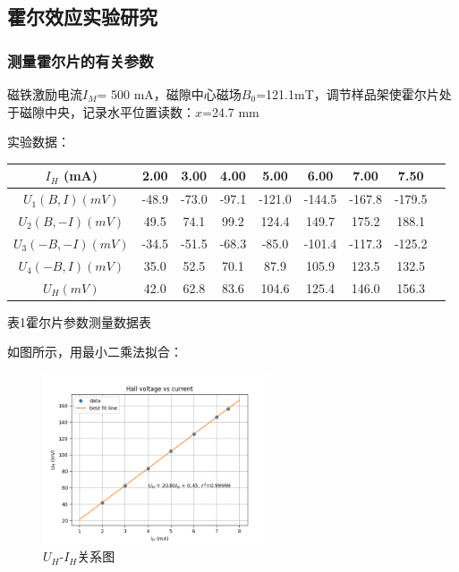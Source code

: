 \documentclass[UTF8]{ctexart}
\begin{document}
\subsection{霍尔效应实验研究}

\subsubsection{测量霍尔片的有关参数}

磁铁激励电流$I_M$= 500 mA，磁隙中心磁场$B_0$=121.1mT，调节样品架使霍尔片处于磁隙中央，记录水平位置读数：$x$=24.7 mm

实验数据：

\begin{center}
    \begin{tabular}{|c|c|c|c|c|c|c|c|c|}
        \hline
        $I_H$ (mA) & 2.00 & 3.00 & 4.00 & 5.00 & 6.00 & 7.00 & 7.50 \\\hline
        $U_1(B,I) (mV)$ & -48.9 & -73.0 & -97.1 & -121.0 & -144.5 & -167.8 & -179.5 \\\hline
        $U_2(B,-I) (mV)$ & 49.5 & 74.1 & 99.2 & 124.4 & 149.7 & 175.2 & 188.1 \\\hline
        $U_3(-B,-I) (mV)$ & -34.5 & -51.5 & -68.3 & -85.0 & -101.4 & -117.3 & -125.2 \\\hline
        $U_4(-B,I) (mV)$ & 35.0 & 52.5 & 70.1 & 87.9 & 105.9 & 123.5 & 132.5 \\\hline
        $U_H (mV)$ & 42.0 & 62.8 & 83.6 & 104.6 & 125.4 & 146.0 & 156.3 \\\hline
    \end{tabular}
    \begin{minipage}{0.8\textwidth}
        \centering
        \fontsize{9pt}{\baselineskip}\selectfont
        表1\quad 霍尔片参数测量数据表
    \end{minipage}
    \label{Hall_effect_data}
\end{center}

如图所示，用最小二乘法拟合：

\begin{center}
    \begin{figure}[H]
        \centering
        \includegraphics[width=0.6\textwidth]{img/Hall_voltage_vs_current.png}
        \caption{$U_H$-$I_H$关系图}
        \label{U_H-I_H}
    \end{figure}
\end{center}
\end{document}

